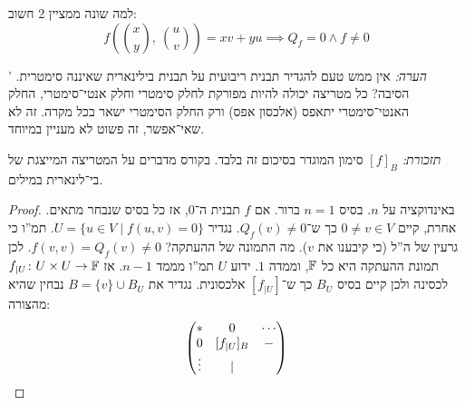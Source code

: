 \documentclass[]{../../../../tex/classes/styledArticle}
\begin{document}
    למה שונה ממציין 2 חשוב: 
    \[ \textstyle f(\binom{x}{y}, \ \binom{u}{v}) = xv + yu \implies Q_f = 0 \land f \neq 0 \]
    
    '
    \textit{הערה: }אין ממש טעם להגדיר תבנית ריבועית על תבנית בילינארית שאיננה סימטרית. הסיבה? כל מטריצה יכולה להיות מפורקת לחלק סימטרי וחלק אנטי־סימטרי, החלק האנטי־סימטרי יתאפס (אלכסון אפס) ורק החלק הסימטרי ישאר בכל מקרה. זה לא שאי־אפשר, זה פשוט לא מעניין במיוחד. 
    
    
    \textit{תזכורת: }$[f]_B$ סימון המוגדר בסיכום זה בלבד. בקורס מדברים על המטריצה המייצגת של בי־לינארית במילים. 
    
    \begin{proof}
        באינדוקציה על $n$. בסיס $n = 1$ ברור. אם $f$ תבנית ה־$0$, אז כל בסיס שנבחר מתאים. אחרת, קיים $0 \neq v \in V$ כך ש־$Q_f(v) \neq 0$. נגדיר $U = \{u \in V \mid f(u, v) = 0\}$. תמ''ו כי גרעין של ה''ל (כי קיבענו את $v$). מה התמונה של ההעתקה? $f(v, v) = Q_f(v) \neq 0$. לכן תמונת ההעתקה היא כל $\mathbb{F}$, וממדה $1$. ידוע $U$ תמ''ו מממד $n - 1$. אז $f_{|U} \colon U\times U \to \mathbb{F}$ לכסינה ולכן קיים בסיס $B_U$ כך ש־$[f_{|U}]$ אלכסונית. נגדיר את $B = \{v\} \cup B_U$ נבחין שהיא מהצורה: 
        \[ \begin{pmatrix} * & 0& \cdots \\ 0 & [f_{|U}]_B& - \\ \vdots & \vert \end{pmatrix} \]
    \end{proof}
    
    \ndoc
    
\end{document}
